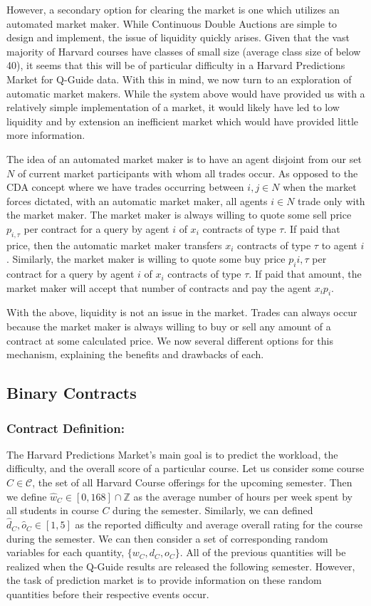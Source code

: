 However, a secondary option for clearing the market is one which utilizes an automated market maker. While Continuous Double Auctions are simple to design and implement, the issue of liquidity quickly arises. Given that the vast majority of Harvard courses have classes of small size (average class size of below 40), it seems that this will be of particular difficulty in a Harvard Predictions Market for Q-Guide data. With this in mind, we now turn to an exploration of automatic market makers. While the system above would have provided us with a relatively simple implementation of a market, it would likely have led to low liquidity and by extension an inefficient market which would have provided little more information.

The idea of an automated market maker is to have an agent disjoint from our set $N$ of current market participants with whom all trades occur. As opposed to the CDA concept where we have trades occurring between $i,j \in N$ when the market forces dictated, with an automatic market maker, all agents $i \in N$ trade only with the market maker. The market maker is always willing to quote some sell price $p_{i,\tau}$ per contract for a query by agent $i$ of $x_i$ contracts of type $\tau$. If paid that price, then the automatic market maker transfers $x_i$ contracts of type $\tau$ to agent $i$. Similarly, the market maker is willing to quote some buy price $p_i{i,\tau}$ per contract for a query by agent $i$ of $x_i$ contracts of type $\tau$. If paid that amount, the market maker will accept that number of contracts and pay the agent $x_ip_i$. 

With the above, liquidity is not an issue in the market. Trades can always occur because the market maker is always willing to buy or sell any amount of a contract at some calculated price. We now several different options for this mechanism, explaining the benefits and drawbacks of each.

\subsection{Binary Contracts}
\subsubsection{Contract Definition:}
The Harvard Predictions Market's main goal is to predict the workload, the difficulty, and the overall score of a particular course. Let us consider some course $C \in \mathcal{C}$, the set of all Harvard Course offerings for the upcoming semester. Then we define $\hat{w}_C \in [0,168] \cap \mathbb{Z}$ as the average number of hours per week spent by all students in course $C$ during the semester. Similarly, we can defined $\hat{d}_C,\hat{o}_C \in [1,5]$ as the reported difficulty and average overall rating for the course during the semester. We can then consider a set of corresponding random variables for each quantity, $\{ w_C, d_C, o_C \}$. All of the previous quantities will be realized when the Q-Guide results are released the following semester. However, the task of prediction market is to provide information on these random quantities before their respective events occur. 

